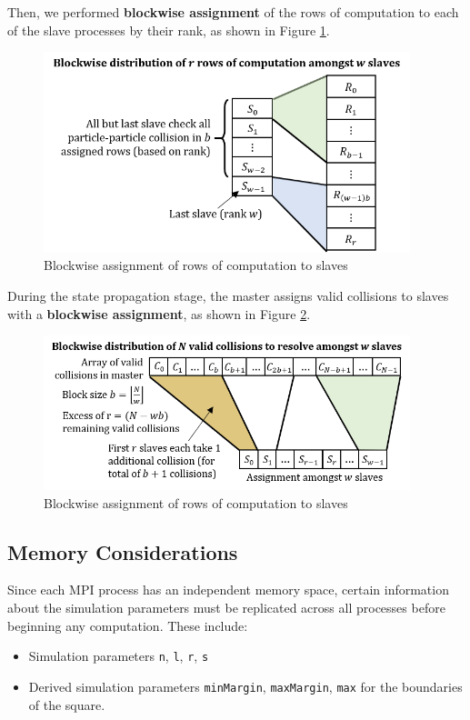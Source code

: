 \documentclass[12pt]{article}
\begin{document}
Then, we performed \textbf{blockwise assignment} of the rows of computation to each of the slave processes by their rank, as shown in Figure \ref{fig:collisionMatrixFoldedAssignment}.

\begin{figure}[H]
    \centering
    \includegraphics[width=0.95\textwidth]{reportAssets/chap3collisionMatrixDecomposition.png}
    \caption{Blockwise assignment of rows of computation to slaves}
    \label{fig:collisionMatrixFoldedAssignment}
\end{figure}

During the state propagation stage, the master assigns valid collisions to slaves with a \textbf{blockwise assignment}, as shown in Figure \ref{fig:collisionArrayAssignment}.

\begin{figure}[H]
    \centering
    \includegraphics[width=0.95\textwidth]{reportAssets/chap3collisionArrayDecomposition.png}
    \caption{Blockwise assignment of rows of computation to slaves}
    \label{fig:collisionArrayAssignment}
\end{figure}

\subsection{Memory Considerations}
Since each MPI process has an independent memory space, certain information about the simulation parameters must be replicated across all processes before beginning any computation. These include:
\begin{itemize}
    \item Simulation parameters \texttt{n}, \texttt{l}, \texttt{r}, \texttt{s}
    \item Derived simulation parameters \texttt{minMargin}, \texttt{maxMargin}, \texttt{max} for the boundaries of the square.
\end{itemize}
\end{document}
